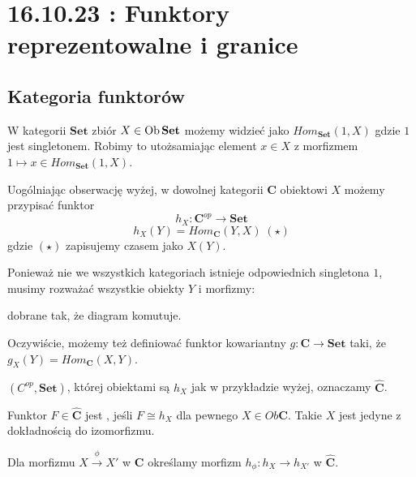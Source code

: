 \section{16.10.23 : Funktory reprezentowalne i granice}

\subsection{Kategoria funktorów}

W kategorii $\mathbf{Set}$ zbiór $X\in \operatorname{Ob}\mathbf{Set}$ możemy widzieć jako $Hom_{\mathbf{Set}}(1,X)$ gdzie $1$ jest singletonem. Robimy to utożsamiając element $x\in X$ z morfizmem $1\mapsto x\in Hom_{\mathbf{Set}}(1, X)$.

Uogólniając obserwację wyżej, w dowolnej kategorii $\mathbf{C}$ obiektowi $X$ możemy przypisać funktor 
    $$h_X:\mathbf{C}^{op}\to \mathbf{Set}$$
    $$h_X(Y)=Hom_{\mathbf{C}}(Y, X) \; (\star)$$
    gdzie $(\star)$ zapisujemy czasem jako $X(Y)$.

    Ponieważ nie we wszystkich kategoriach istnieje odpowiednich singletona $1$, musimy rozważać wszystkie obiekty $Y$ i morfizmy:
    
    \begin{center}\end{center}
    dobrane tak, że diagram komutuje.


    Oczywiście, możemy też definiować funktor kowariantny $g:\mathbf{C}\to\mathbf{Set}$ taki, że $g_X(Y)=Hom_{\mathbf{C}}(X, Y)$.

\begin{definition}
   $(C^{op},\mathbf{Set})$, której obiektami są $h_X$ jak w przykładzie wyżej, oznaczamy $\hat{\mathbf{C}}$. 

  Funktor $F\in\hat{\mathbf{C}}$ jest , jeśli $F\cong h_X$ dla pewnego $X\in Ob\mathbf{C}$. Takie $X$ jest jedyne z dokładnością do izomorfizmu.
 
  Dla morfizmu $X\xrightarrow{\phi} X'$ w $\mathbf{C}$ określamy morfizm $h_\phi:h_X\to h_{X'}$ w $\mathbf{\hat{C}}$.

  \begin{center}\end{center}
\end{definition}

